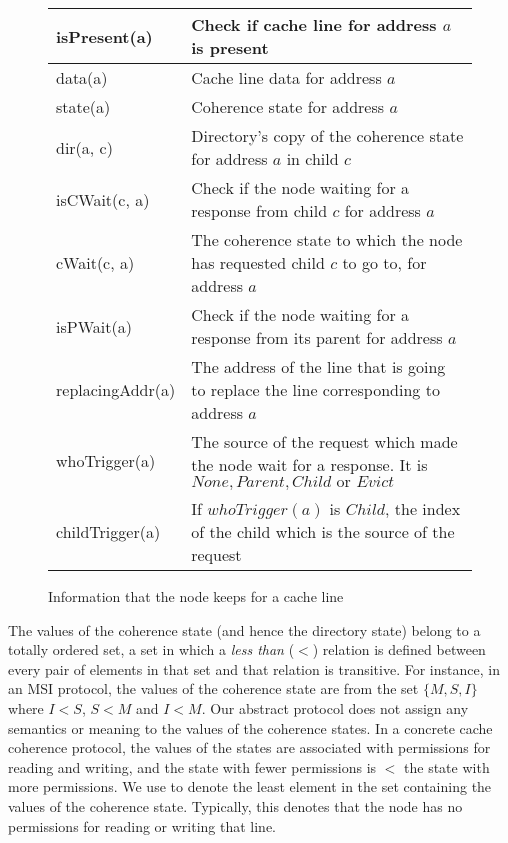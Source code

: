 \begin{figure}
\begin{tabular}{|l|p{}|}
\hline
isPresent(a) & Check if cache line for address $a$ is present\\
\hline
data(a) & Cache line data for address $a$\\
\hline
state(a) & Coherence state for address $a$\\
\hline
dir(a, c) & Directory's copy of the coherence state for address $a$ in child
$c$\\
\hline
isCWait(c, a) & Check if the node waiting for a response from child $c$
for address $a$\\
\hline
cWait(c, a) & The coherence state to which the node has requested child $c$ to
go to, for address $a$\\
\hline
isPWait(a) & Check if the node waiting for a response from its parent for
address $a$\\
\hline
replacingAddr(a) & The address of the line that is going to replace the line
corresponding to address $a$\\
\hline
whoTrigger(a) & The source of the request which made the node wait for a
response. It is $None, Parent, Child \text{ or } Evict$\\
\hline
childTrigger(a) & If $whoTrigger(a)$ is $Child$, the index of the child which
is the source of the request\\
\hline
\end{tabular}
\caption{Information that the node keeps for a cache line}
\label{table:states}
\end{figure}

The values of the coherence state (and hence the directory state) belong to a
totally ordered set, \ie a set in which a \emph{less than} ($<$) relation is
defined between every pair of elements in that set and that relation is
transitive. For instance, in an MSI protocol, the values of the coherence state
are from the set $\{M, S, I\}$ where $I < S$, $S < M$ and $I < M$. Our abstract
protocol does not assign any semantics or meaning to the values of the coherence
states. In a concrete cache coherence protocol, the values of the states are
associated with permissions for reading and writing, and the state with fewer
permissions is $<$ the state with more permissions. We use \Inv to denote the
least element in the set containing the values of the coherence state.
Typically, this denotes that the node has no permissions for reading or writing
that line.

